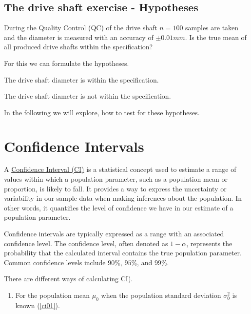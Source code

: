 \documentclass[
  a4paper,
]{scrbook}
\providecommand{\tightlist}{%
  \setlength{\itemsep}{0pt}\setlength{\parskip}{0pt}}\usepackage{longtable,booktabs,array}
\let\olddescription\description
\let\endolddescription\enddescription
\renewenvironment{description}{
          \begin{spacing}{1.5}\olddescription
        }{
          \endolddescription\end{spacing}
        }
\begin{document}
\subsection{The drive shaft exercise -
Hypotheses}\label{the-drive-shaft-exercise---hypotheses-1}

During the \hyperref[acronyms_QC]{Quality Control (QC)} of the drive
shaft \(n=100\) samples are taken and the diameter is measured with an
accuracy of \(\pm 0.01mm\). Is the true mean of all produced drive
shafts within the specification?

For this we can formulate the hypotheses.

\begin{description}
\tightlist
\item[{\hyperref[acronyms_H0]{H0}}]
The drive shaft diameter is within the specification.
\item[{\hyperref[acronyms_Ha]{Ha}:}]
The drive shaft diameter is not within the specification.
\end{description}

In the following we will explore, how to test for these hypotheses.

\section{Confidence Intervals}\label{confidence-intervals}

A \hyperref[acronyms_CI]{Confidence Interval (CI)} is a statistical
concept used to estimate a range of values within which a population
parameter, such as a population mean or proportion, is likely to fall.
It provides a way to express the uncertainty or variability in our
sample data when making inferences about the population. In other words,
it quantifies the level of confidence we have in our estimate of a
population parameter.

Confidence intervals are typically expressed as a range with an
associated confidence level. The confidence level, often denoted as
\(1-\alpha\), represents the probability that the calculated interval
contains the true population parameter. Common confidence levels include
\(90\%\), \(95\%\), and \(99\%\).

There are different ways of calculating \hyperref[acronyms_CI]{CI}).

\begin{enumerate}
\def\labelenumi{\arabic{enumi}.}
\tightlist
\item
  For the population mean \hyperref[truemean-gloss]{\(\mu_0\)} when the
  population standard deviation
  \hyperref[truevariance-gloss]{\(\sigma_0^2\)} is known (\eqref{ci01}).
\end{enumerate}
\end{document}
